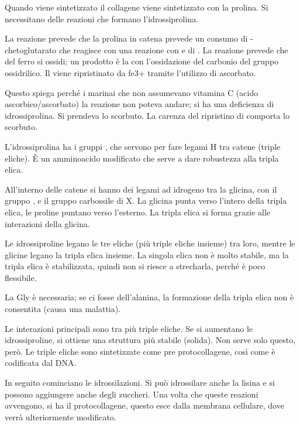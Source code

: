 
Quando viene sintetizzato il collagene viene
sintetizzato con la prolina. Si necessitano delle reazioni che formano
l'idrossiprolina.


La reazione prevede che la prolina in catena prevede un consumo di
\alpha-chetoglutarato che reagisce con una reazione con  e di . La reazione
prevede che del ferro si ossidi; un prodotto è la  con l'ossidazione
del carbonio del gruppo ossidrilico. Il  viene ripristinato da fe3+ tramite l'utilizzo di
ascorbato.


Questo spiega perché i marinai che non assumevano vitamina C (acido
ascorbico/ascorbato) la reazione non poteva andare; si ha una deficienza di
idrossiprolina. Si prendeva lo scorbuto. La carenza del ripristino di
 comporta lo scorbuto.

L'idrossiprolina ha i gruppi , che servono per fare legami H tra
catene (triple eliche). È un amminoacido modificato che serve a dare
robustezza alla tripla elica.

All'interno delle catene si hanno dei legami ad idrogeno tra la glicina, con il gruppo , e il gruppo carbossile di X. La glicina punta verso l'intero della tripla elica, le proline
puntano verso l'esterno. La tripla elica si forma grazie alle
interazioni della glicina.

Le idrossiproline legano le tre eliche (più triple eliche insieme) tra
loro, mentre le glicine legano la tripla elica insieme.
La singola elica non è molto stabile, ma la tripla elica è stabilizzata, quindi non si riesce a strecharla, perché è poco flessibile.

La Gly è necessaria; se ci fosse dell'alanina, la formazione della
tripla elica non è consentita (causa una malattia).

Le interazioni principali sono tra più triple eliche. Se si aumentano le
idrossiproline, si ottiene una struttura più stabile (solida). Non serve
solo questo, però.
Le triple eliche sono sintetizzate come pre protocollagene, così come è
codificata dal DNA.

In seguito cominciano le idrossilazioni. Si può idrossilare anche la
lisina e si possono aggiungere anche degli zuccheri.
Una volta che queste reazioni avvengono, si ha il protocollagene, questo
esce dalla membrana cellulare, dove verrà ulteriormente modificato.

